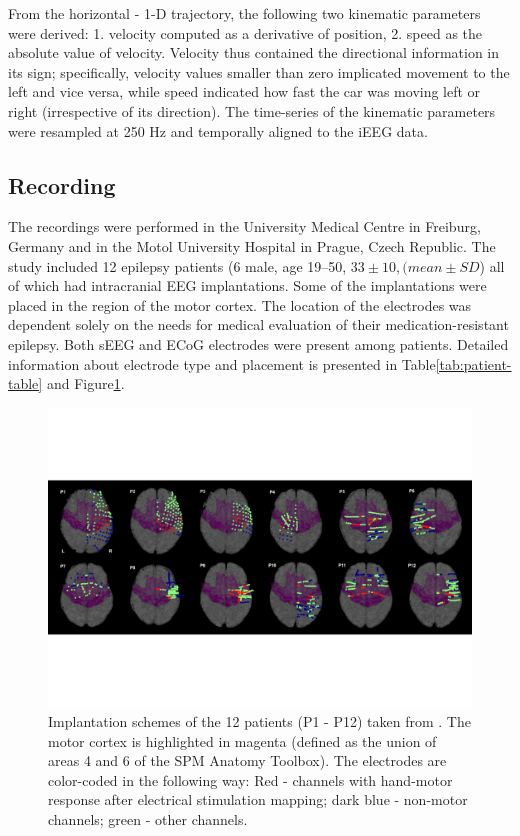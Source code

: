 From the horizontal - 1-D trajectory, the following two kinematic parameters were derived:
1. velocity computed as a derivative of position, 2. speed as the absolute value of velocity.
Velocity thus contained the directional information in its sign;
specifically, velocity values smaller than zero implicated movement to the left and vice versa, while speed indicated how fast the car was moving left or right (irrespective of its direction).
The time-series of the kinematic parameters were resampled at 250 Hz and temporally aligned to the iEEG data.

\subsection{Recording}\label{subsec:recording}
The recordings were performed in the University Medical Centre in Freiburg, Germany and in the Motol University Hospital in Prague, Czech Republic.
The study included 12 epilepsy patients (6 male, age 19--50, $ 33 \pm 10, (mean \pm SD $) all of which had intracranial EEG implantations.
Some of the implantations were placed in the region of the motor cortex.
The location of the electrodes was dependent solely on the needs for medical evaluation of their medication-resistant epilepsy.
Both sEEG and ECoG electrodes were present among patients.
Detailed information about electrode type and placement is presented in Table\ref{tab:patient-table} and Figure\ref{fig:electrodes}.

\begin{figure}[!htbp]
\centering
\includegraphics[width=0.8\linewidth]{img/ch3/electrodes}
\caption{Implantation schemes of the 12 patients (P1 - P12) taken from \cite{Hammer-2021}. The motor cortex is highlighted in magenta (defined as the union of areas 4 and 6 of the SPM Anatomy Toolbox). The electrodes are color-coded in the following way: Red - channels with hand-motor response after electrical stimulation mapping; dark blue - non-motor channels; green - other channels.}
\label{fig:electrodes}
\end{figure}

